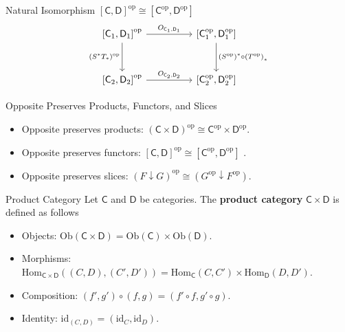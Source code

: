 \begin{proposition}{Natural Isomorphism $\left[\mathsf{C},\mathsf{D}\right]^{\mathrm{op}}\cong \left[\mathsf{C}^{\mathrm{op}},\mathsf{D}^{\mathrm{op}}\right]$}{}
\[\begin{tikzcd}[ampersand replacement=\&, row sep=3em]
            \left[\mathsf{C}_1,\mathsf{D}_1\right]^{\mathrm{op}}\arrow[rr, "O_{\mathsf{C}_1,\mathsf{D}_1}"]\arrow[d, "(S^*T_*)^{\mathrm{op}}"{name=L, left}] 
            \& \&\left[\mathsf{C}_1^{\mathrm{op}},\mathsf{D}_1^{\mathrm{op}}\right]\arrow[d, "\left(S^{\mathrm{op}}\right)^*\circ\left(T^{\mathrm{op}}\right)_*"{name=R}] \\ 
            \left[\mathsf{C}_2,\mathsf{D}_2\right]^{\mathrm{op}}\arrow[rr, "O_{\mathsf{C}_2,\mathsf{D}_2}"]
            \& \&\left[\mathsf{C}_2^{\mathrm{op}},\mathsf{D}_2^{\mathrm{op}}\right]
        \end{tikzcd}
    \]
\end{proposition}


\begin{proposition}{Opposite Preserves Products, Functors, and Slices}{}
    \begin{itemize}
        \item Opposite preserves products:
        $(\mathsf{C} \times \mathsf{D})^{\mathrm{op}} \cong \mathsf{C}^{\mathrm{op}} \times \mathsf{D}^{\mathrm{op}}$.
    \item Opposite preserves functors:
    $[\mathsf{C}, \mathsf{D}]^{\mathrm{op}} \cong [\mathsf{C}^{\mathrm{op}}, \mathsf{D}^{\mathrm{op}}]$ .
    \item Opposite preserves slices:
    $(F \downarrow G)^{\mathrm{op}} \cong\left(G^{\mathrm{op}} \downarrow F^{\mathrm{op}}\right)$.
    \end{itemize}
\end{proposition}

\begin{definition}{Product Category}{}
    Let $\mathsf{C}$ and $\mathsf{D}$ be categories. The \textbf{product category} $\mathsf{C}\times \mathsf{D}$ is defined as follows
    \begin{itemize}
        \item Objects: $\mathrm{Ob}(\mathsf{C}\times \mathsf{D})=\mathrm{Ob}(\mathsf{C})\times \mathrm{Ob}(\mathsf{D})$.
        \item Morphisms: $\mathrm{Hom}_{\mathsf{C}\times \mathsf{D}}((C,D),(C',D'))=\mathrm{Hom}_{\mathsf{C}}(C,C')\times \mathrm{Hom}_{\mathsf{D}}(D,D')$.
        \item Composition: $(f',g')\circ (f,g)=(f'\circ f,g'\circ g)$.
        \item Identity: $\mathrm{id}_{(C,D)}=(\mathrm{id}_C,\mathrm{id}_D)$.
    \end{itemize}
\end{definition}



